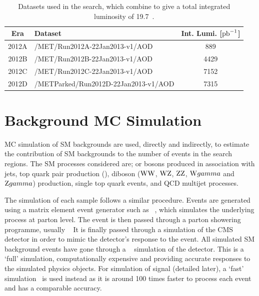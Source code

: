 \begin{table} %
    \begin{center}
    \caption{Datasets used in the search, which combine to give a total integrated luminosity of 19.7~\fbinv.}
     \begin{tabular}{clc}\hline
Era    &       Dataset  &  Int. Lumi. [$\mathrm{pb}^{-1}$]\\ \hline
2012A & /MET/Run2012A-22Jan2013-v1/AOD & 889 \\
2012B & /MET/Run2012B-22Jan2013-v1/AOD & 4429 \\
2012C & /MET/Run2012C-22Jan2013-v1/AOD & 7152 \\
2012D & /METParked/Run2012D-22Jan2013-v1/AOD & 7315 \\ \hline
                \end{tabular}
                    \label{tab:dataSets}
\end{center}
\end{table}




%
\section{Background MC Simulation} 
\label{sec:GEN}
\ac{MC} simulation of \ac{SM} backgrounds are used, directly and indirectly, to estimate the contribution of \ac{SM} backgrounds to the number of events in the search regions. 
The \ac{SM} processes considered are;  \W or \Z bosons produced in association with jets, top quark pair production (\ttbar), diboson ($\mathrm{W}\mathrm{W}{}$, $\mathrm{W}\mathrm{Z}{}$, $\mathrm{Z}\mathrm{Z}{}$, $\mathrm{W}gamma{}$ and $\mathrm{Z}gamma${}) production, single top quark events, and QCD multijet processes.

The simulation of each sample follows a similar procedure.
Events are generated using a matrix element event generator such as \MADGRAPH{}~\cite{madgraph,madgraph2}, which simulates the underlying process at parton level. 
The event is then passed through a parton showering programme, usually \PYTHIA{}~\cite{pythia,pythia8} 
It is finally passed through a simulation of the CMS detector in order to mimic the detector's response to the event.
All simulated \ac{SM} background events have gone through a \GEANTfour~\cite{Geant4-1,Geant4-2} simulation of the detector. 
This is a `full' simulation, computationally expensive and providing accurate responses to the simulated physics objects.  
For simulation of signal (detailed later), a `fast' simulation~\cite{FASTSIM} is used instead as it is around 100 times faster to process each event and has a comparable accuracy.

